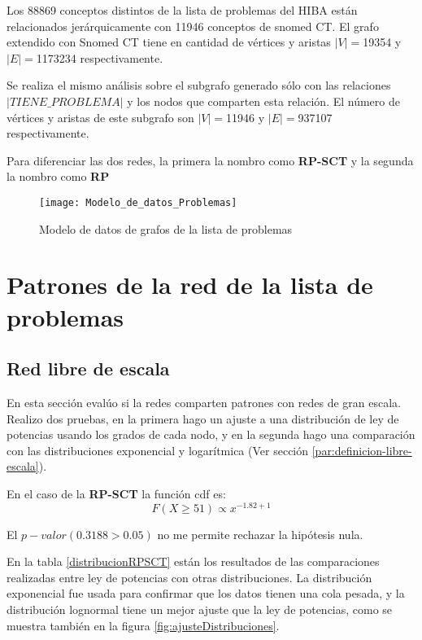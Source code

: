 Los \num{88869} conceptos distintos de la lista de problemas del \acrshort{HIBA} están relacionados jerárquicamente con \num{11946} conceptos de snomed CT.  El grafo extendido con Snomed CT tiene en cantidad de vértices y aristas $|V|=$\num{19354} y $|E|=$\num{1173234} respectivamente. 

Se realiza el mismo análisis sobre el subgrafo generado sólo con las relaciones $|\textit{TIENE\_PROBLEMA}|$ y los nodos que comparten esta relación. El número de vértices y aristas de este subgrafo son $|V|=$\num{11946} y $|E|=$\num{937107} respectivamente.

Para diferenciar las dos redes, la primera la nombro como \textbf{\acrfull{RP-SCT}} y la segunda la nombro como \textbf{{\acrfull{RP}}}

\begin{figure}[ht]
\caption{Modelo de datos de grafos de la lista de problemas}
\label{fig:ModeloGrafo}
\centering
\texttt{[image: Modelo\_de\_datos\_Problemas]}
\end{figure}

\section{Patrones de la red de la lista de problemas}
\subsection{Red libre de escala}
En esta sección evalúo si la redes comparten patrones con redes de gran escala. Realizo dos pruebas, en la primera hago un ajuste a una distribución de ley de potencias usando los grados de cada nodo, y en la segunda hago una comparación con las distribuciones exponencial y logarítmica (Ver sección \ref{par:definicion-libre-escala}).

En el caso de la \textbf{\acrshort{RP-SCT}} la función \acrshort{cdf} es:
\begin{equation}
F(X\geq 51) \propto x^{-1.82 +1}
\end{equation}

El $p-valor(0.3188>0.05)$ no me permite rechazar la hipótesis nula.

En la tabla \ref{distribucionRPSCT} están los resultados de las comparaciones realizadas entre ley de potencias con otras distribuciones. La distribución exponencial fue usada para confirmar que los datos tienen una cola pesada, y la distribución lognormal tiene un mejor ajuste que la ley de potencias, como se muestra también en la figura \ref{fig:ajusteDistribuciones}.

